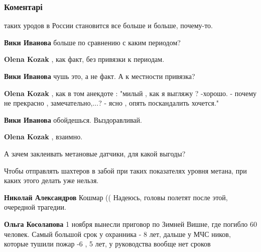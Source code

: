  
 
 
 
 
\subsubsection{Коментарі}
\label{sec:28_11_2021.fb.pikta_svetlana.1.pozhar_shahta_listvjazhnaja.cmt}

\begin{itemize} %
таких уродов в России становится все больше и больше, почему-то.

\begin{itemize} %
\textbf{Вики Иванова} больше по сравнению с каким периодом?

\textbf{Olena Kozak} , как факт, без привязки к периодам.

\textbf{Вики Иванова} чушь это, а не факт. А к местности привязка?

\textbf{Olena Kozak} , как в том анекдоте : "милый , как я выгляжу ? -хорошо. - почему не прекрасно , замечательно,...? - ясно , опять поскандалить хочется."

\textbf{Вики Иванова} обойдешься. Выздоравливай.

\textbf{Olena Kozak} , взаимно.
\end{itemize} %

А зачем заклеивать метановые датчики, для какой выгоды?

\begin{itemize} %
Чтобы отправлять шахтеров в забой при таких показателях уровня метана, при каких этого делать уже нельзя.

\textbf{Николай Александров} Кошмар (( Надеюсь, головы полетят после этой, очередной трагедии.


\textbf{Ольга Косолапова} 1 ноября вынесли приговор по Зимней Вишне, где погибло 60 человек. Самый большой срок у охранника - 8 лет, дальше у МЧС ников, которые тушили пожар -6 , 5 лет, у руководства вообще нет сроков


\end{itemize}
\end{itemize}
